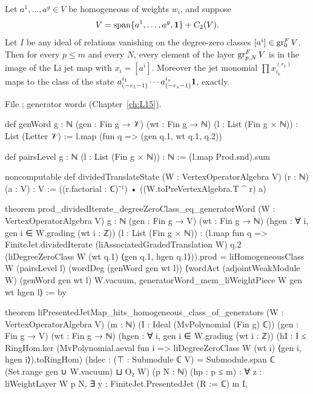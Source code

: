 \begin{theorem}\label{l11:thm:hits}
Let $a^1,\dots,a^g\in V$ be homogeneous of weights $w_i$, and suppose
\begin{equation*}
V = \operatorname{span}\{a^1,\dots,a^g,\mathbf{1}\} + C_2(V).
\end{equation*}
Let $I$ be any ideal of relations vanishing on the degree-zero classes $[a^i]\in\operatorname{gr}^F_0V$. Then for every
$p\le m$ and every $N$, every element of the layer $\operatorname{gr}^F_{p,N}V$ is in the image of the Li jet map with
$x_i = [a^i]$. Moreover the jet monomial $\prod x_{i_k}^{(r_k)}$ maps to the class of the state
$a^{i_1}_{(-r_1-1)}\cdots a^{i_s}_{(-r_s-1)}\mathbf{1}$, exactly.
\end{theorem}
\noindent File ; generator words
 (Chapter~\ref{ch:L15}).
\begin{leancode}
def genWord {g : ℕ} (gen : Fin g → 𝒱) (wt : Fin g → ℕ) (l : List (Fin g × ℕ)) :
    List (Letter 𝒱) :=
  l.map (fun q => (gen q.1, wt q.1, q.2))

def pairsLevel {g : ℕ} (l : List (Fin g × ℕ)) : ℕ := (l.map Prod.snd).sum

noncomputable def dividedTranslateState (W : VertexOperatorAlgebra V) (r : ℕ) (a : V) : V :=
  ((r.factorial : ℂ)⁻¹) • ((W.toPreVertexAlgebra.T ^ r) a)

theorem prod_dividedIterate_degreeZeroClass_eq_generatorWord
    (W : VertexOperatorAlgebra V)
    {g : ℕ} (gen : Fin g → V) (wt : Fin g → ℕ)
    (hgen : ∀ i, gen i ∈ W.grading (wt i : ℤ)) (l : List (Fin g × ℕ)) :
    (l.map fun q =>
      FiniteJet.dividedIterate (liAssociatedGradedTranslation W) q.2
        (liDegreeZeroClass W (wt q.1) ⟨gen q.1, hgen q.1⟩)).prod =
      liHomogeneousClass W (pairsLevel l) (wordDeg (genWord gen wt l))
        ⟨wordAct (adjointWeakModule W) (genWord gen wt l) W.vacuum,
          generatorWord_mem_liWeightPiece W gen wt hgen l⟩ := by

theorem liPresentedJetMap_hits_homogeneous_class_of_generators
    (W : VertexOperatorAlgebra V) (m : ℕ)
    (I : Ideal (MvPolynomial (Fin g) ℂ))
    (gen : Fin g → V) (wt : Fin g → ℕ)
    (hgen : ∀ i, gen i ∈ W.grading (wt i : ℤ))
    (hI : I ≤ RingHom.ker
      (MvPolynomial.aeval fun i => liDegreeZeroClass W (wt i) ⟨gen i, hgen i⟩).toRingHom)
    (hdec : (⊤ : Submodule ℂ V) =
      Submodule.span ℂ (Set.range gen ∪ {W.vacuum}) ⊔ O₂ W)
    (p N : ℕ) (hp : p ≤ m) :
    ∀ z : liWeightLayer W p N,
      ∃ y : FiniteJet.PresentedJet (R := ℂ) m I,
\end{leancode}

